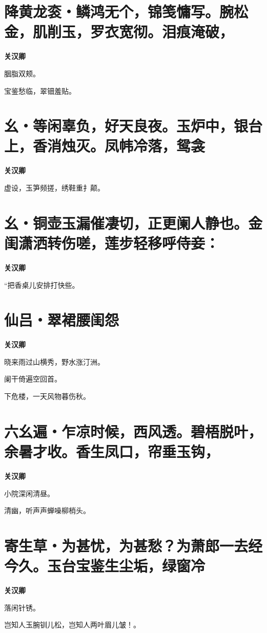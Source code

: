 \documentclass[12pt,a4paper]{ctexbook}
\begin{document}
\section{降黄龙衮・鳞鸿无个，锦笺慵写。腕松金，肌削玉，罗衣宽彻。泪痕淹破，}
\textbf{关汉卿}\par\vspace{0.5em}
胭脂双颊。\par
宝鉴愁临，翠钿羞贴。\par

\section{幺・等闲辜负，好天良夜。玉炉中，银台上，香消烛灭。凤帏冷落，鸳衾}
\textbf{关汉卿}\par\vspace{0.5em}
虚设，玉笋频搓，绣鞋重扌颠。\par

\section{幺・铜壶玉漏催凄切，正更阑人静也。金闺潇洒转伤嗟，莲步轻移呼侍妾：}
\textbf{关汉卿}\par\vspace{0.5em}
“把香桌儿安排打快些。\par

\section{仙吕・翠裙腰闺怨}
\textbf{关汉卿}\par\vspace{0.5em}
晓来雨过山横秀，野水涨汀洲。\par
阑干倚遍空回首。\par
下危楼，一天风物暮伤秋。\par

\section{六幺遍・乍凉时候，西风透。碧梧脱叶，余暑才收。香生凤口，帘垂玉钩，}
\textbf{关汉卿}\par\vspace{0.5em}
小院深闲清昼。\par
清幽，听声声蝉噪柳梢头。\par

\section{寄生草・为甚忧，为甚愁？为萧郎一去经今久。玉台宝鉴生尘垢，绿窗冷}
\textbf{关汉卿}\par\vspace{0.5em}
落闲针锈。\par
岂知人玉腕钏儿松，岂知人两叶眉儿皱！。\par
\end{document}
